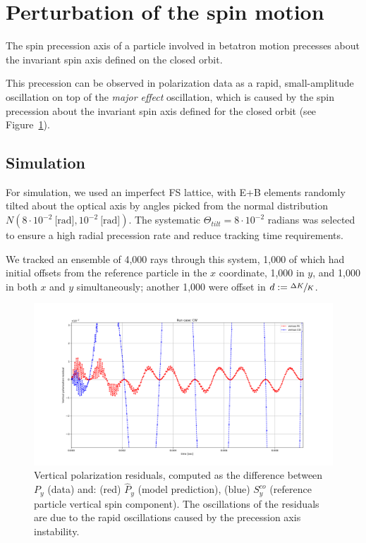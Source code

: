 \documentclass{article}
\begin{document}
\section{Perturbation of the spin motion}
The spin precession axis of a particle involved in betatron motion precesses about the invariant spin axis defined on the closed orbit.

This precession can be observed in polarization data as a rapid, small-amplitude oscillation on top of the \emph{major effect} oscillation, which is caused by the spin precession about the invariant spin axis defined for the closed orbit (see Figure~\ref{fig:Py_fit_residual}). 

\subsection{Simulation}
For simulation, we used an imperfect FS lattice, with E+B elements randomly tilted about the optical axis by angles picked from the normal distribution $N(8\cdot 10^{-2}~\text{[rad]}, 10^{-2}~\text{[rad]})$. The systematic $\Theta_{tilt} = 8\cdot 10^{-2}$ radians was selected to ensure a high radial precession rate and reduce tracking time requirements.

We tracked an ensemble of 4,000 rays through this system, 1,000 of which had initial offsets from the reference particle in the $x$ coordinate, 1,000 in $y$, and 1,000 in both $x$ and $y$ simultaneously; another 1,000 were offset in $d := \sfrac{\Delta K}{K}$.

\begin{figure}[!h]
  \centering
  \includegraphics[width=\linewidth]{img/spin_axis_motion/Py_fit_residual}
  \caption{Vertical polarization residuals, computed as the difference between $P_y$ (data) and: (red) $\hat P_y$ (model prediction), (blue) $S_y^{co}$ (reference particle vertical spin component). The oscillations of the residuals are due to the rapid oscillations caused by the precession axis instability.\label{fig:Py_fit_residual}}
\end{figure}






\end{document}
